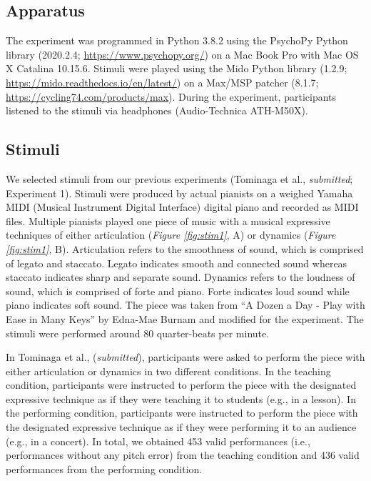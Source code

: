 \documentclass[
  man,floatsintext]{apa6}
\begin{document}
\hypertarget{apparatus}{%
\subsection{Apparatus}\label{apparatus}}

The experiment was programmed in Python 3.8.2 using the PsychoPy Python library (2020.2.4; \url{https://www.psychopy.org/}) on a Mac Book Pro with Mac OS X Catalina 10.15.6. Stimuli were played using the Mido Python library (1.2.9; \url{https://mido.readthedocs.io/en/latest/}) on a Max/MSP patcher (8.1.7; \url{https://cycling74.com/products/max}). During the experiment, participants listened to the stimuli via headphones (Audio-Technica ATH-M50X).

\hypertarget{stimuli}{%
\subsection{Stimuli}\label{stimuli}}

We selected stimuli from our previous experiments (Tominaga et al., \emph{submitted}; Experiment 1). Stimuli were produced by actual pianists on a weighed Yamaha MIDI (Musical Instrument Digital Interface) digital piano and recorded as MIDI files. Multiple pianists played one piece of music with a musical expressive techniques of either articulation (\emph{Figure \ref{fig:stim1}}, A) or dynamics (\emph{Figure \ref{fig:stim1}}, B). Articulation refers to the smoothness of sound, which is comprised of legato and staccato. Legato indicates smooth and connected sound whereas staccato indicates sharp and separate sound. Dynamics refers to the loudness of sound, which is comprised of forte and piano. Forte indicates loud sound while piano indicates soft sound. The piece was taken from ``A Dozen a Day - Play with Ease in Many Keys'' by Edna-Mae Burnam and modified for the experiment. The stimuli were performed around 80 quarter-beats per minute.

In Tominaga et al., (\emph{submitted}), participants were asked to perform the piece with either articulation or dynamics in two different conditions. In the teaching condition, participants were instructed to perform the piece with the designated expressive technique as if they were teaching it to students (e.g., in a lesson). In the performing condition, participants were instructed to perform the piece with the designated expressive technique as if they were performing it to an audience (e.g., in a concert). In total, we obtained 453 valid performances (i.e., performances without any pitch error) from the teaching condition and 436 valid performances from the performing condition.
\end{document}
